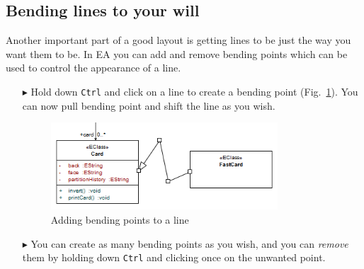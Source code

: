 \newpage

\subsection{Bending lines to your will}

Another important part of a good layout is getting lines to be just the way you want them to be. In EA you can add and remove bending points which can be used
to control the appearance of a line.

\begin{enumerate}
\item[$\blacktriangleright$]Hold down \texttt{Ctrl} and click on a line to create a bending point (Fig.~\ref{ea:bendLines}). You can now pull bending point
and shift the line as you wish.
 
\begin{figure}[htbp]
\begin{center}
  \includegraphics[width=0.8\textwidth]{ea_bendingLines}
  \caption{Adding bending points to a line}   
  \label{ea:bendLines}
\end{center}
\end{figure}

\item[$\blacktriangleright$] You can create as many bending points as you wish, and you can \emph{remove} them by holding down \texttt{Ctrl} and clicking once
on the unwanted point.
\end{enumerate}
